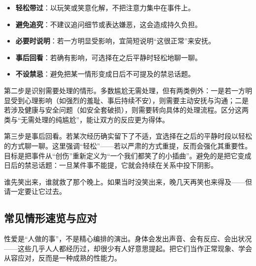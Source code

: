 \documentclass[12pt,UTF8]{ctexbook}
\newcommand{\keyword}[1]{\textbf{#1}}
\begin{document}
\begin{itemize}
  \item \keyword{轻松带过}：以玩笑或笑意化解，不把注意力集中在事件上。
  \item \keyword{避免追究}：不建议追问细节或表达嫌恶，这会造成持久负担。
  \item \keyword{必要时说明}：若一方明显受影响，宜简短说明“这很正常”来安抚。
  \item \keyword{事后回看}：若确有影响，可选择在之后平静时轻松地聊一聊。
  \item \keyword{不设禁忌}：避免把某一情形变成日后不可提及的禁忌话题。
\end{itemize}

第二步是识别需要处理的情形。多数尴尬无需处理，但有两类例外：一是若一方明显受到心理影响（如强烈的羞耻、事后持续不安），则需要主动安抚与沟通；二是若涉及健康与安全问题（如安全套破损），则需要转向具体的处理流程。区分这两类与“无需处理的纯尴尬”，能让双方的反应更为得体。

第三步是事后回看。若某次经历确实留下了不适，宜选择在之后的平静时段以轻松的方式聊一聊。这里强调“轻松”——若以严肃的方式重提，反而会强化其重要性。目标是把事件从“创伤”重新定义为“一个我们都笑了的小插曲”。避免的是把它变成日后的禁忌话题：一旦某件事不能提，它就会持续在关系中投下阴影。

\begin{tcolorbox}[colback=pink!5!white,colframe=red!50!black,title=贴心小叮咛]
谁先笑出来，谁就救了那个晚上。如果当时没笑出来，晚几天再笑也来得及——但请一定要让它过去。
\end{tcolorbox}

\subsection{常见情形速览与应对}

性爱是“人做的事”，不是精心编排的演出。身体会发出声音、会有反应、会出状况——这些几乎人人都经历过，却很少有人好意思提起。把它们当作正常现象、学会从容应对，反而是一种成熟的性能力。
\end{document}
